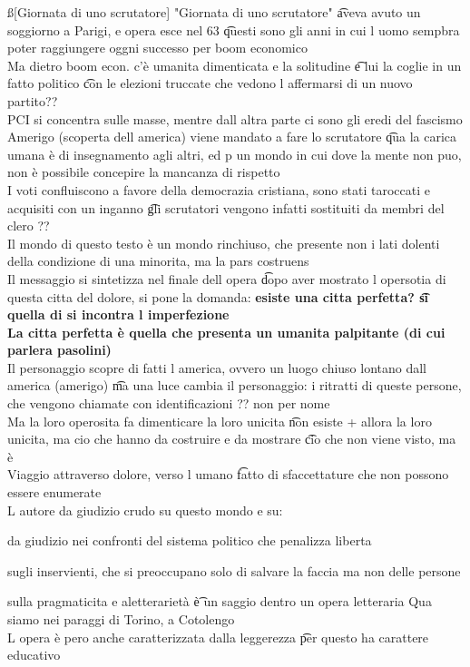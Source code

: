 \documentclass[12pt]{article}
\begin{document}
\ss[Giornata di uno scrutatore]
"Giornata di uno scrutatore" \t aveva avuto un soggiorno a Parigi, e opera esce nel 63 \t questi sono gli anni in cui l uomo sempbra poter raggiungere oggni successo per boom economico \\
Ma dietro boom econ. c'è umanita dimenticata e la solitudine \t e lui la coglie in un fatto politico \t con le elezioni truccate che vedono l affermarsi di un nuovo partito?? \\
PCI si concentra sulle masse, mentre dall altra parte ci sono gli eredi del fascismo \\
Amerigo (scoperta dell america) viene mandato a fare lo scrutatore \t qua la carica umana è di insegnamento agli altri, ed p un mondo in cui dove la mente non puo, non è possibile concepire la mancanza di rispetto \\
I voti confluiscono a favore della democrazia cristiana, sono stati taroccati e acquisiti con un inganno \t gli scrutatori vengono infatti sostituiti da membri del clero ?? \\
Il mondo di questo testo è un mondo rinchiuso, che presente non i lati dolenti della condizione di una minorita, ma la pars costruens \\
Il messaggio si sintetizza nel finale dell opera \t dopo aver mostrato l opersotia di questa citta del dolore, si pone la domanda: \textbf{esiste una citta perfetta? \t si quella di si incontra l imperfezione} \\
\textbf{La citta perfetta è quella che presenta un umanita palpitante (di cui parlera pasolini)} \\
Il personaggio scopre di fatti l america, ovvero un luogo chiuso lontano dall america (amerigo) \t ma una luce cambia il personaggio: i ritratti di queste persone, che vengono chiamate con identificazioni ?? non per nome \\
Ma la loro operosita fa dimenticare la loro unicita \t non esiste + allora la loro unicita, ma cio che hanno da costruire e da mostrare \t cio che non viene visto, ma è \\
Viaggio attraverso dolore, verso l umano \t fatto di sfaccettature che non possono essere enumerate \\
L autore da giudizio crudo su questo mondo e su: 
\bi
  \item da giudizio nei confronti del sistema politico che penalizza liberta
  \item sugli inservienti, che si preoccupano solo di salvare la faccia ma non delle persone
  \item sulla pragmaticita e aletterarietà \t è un saggio dentro un opera letteraria
\ei
Qua siamo nei paraggi di Torino, a Cotolengo \\
L opera è pero anche caratterizzata dalla leggerezza \t per questo ha carattere educativo
\end{document}
